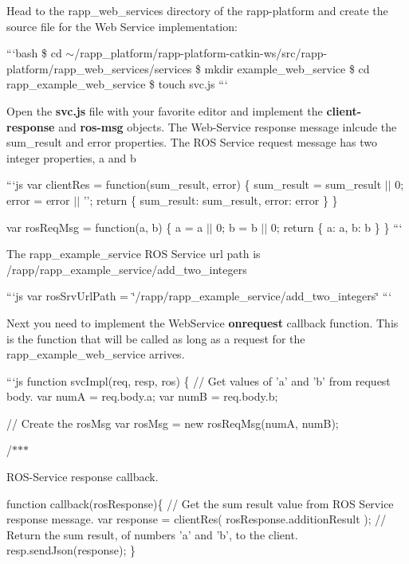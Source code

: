 Head to the {\ttfamily rapp\-\_\-web\-\_\-services} directory of the {\ttfamily rapp-\/platform} and create the source file for the Web Service implementation\-:

```bash \$ cd $\sim$/rapp\-\_\-platform/rapp-\/platform-\/catkin-\/ws/src/rapp-\/platform/rapp\-\_\-web\-\_\-services/services \$ mkdir example\-\_\-web\-\_\-service \$ cd rapp\-\_\-example\-\_\-web\-\_\-service \$ touch svc.\-js ```

Open the {\bfseries svc.\-js} file with your favorite editor and implement the {\bfseries client-\/response} and {\bfseries ros-\/msg} objects. The Web-\/\-Service response message inlcude the {\ttfamily sum\-\_\-result} and {\ttfamily error} properties. The R\-O\-S Service request message has two integer properties, {\ttfamily a} and {\ttfamily b}

```js var client\-Res = function(sum\-\_\-result, error) \{ sum\-\_\-result = sum\-\_\-result $\vert$$\vert$ 0; error = error $\vert$$\vert$ ''; return \{ sum\-\_\-result\-: sum\-\_\-result, error\-: error \} \}

var ros\-Req\-Msg = function(a, b) \{ a = a $\vert$$\vert$ 0; b = b $\vert$$\vert$ 0; return \{ a\-: a, b\-: b \} \} ```

The rapp\-\_\-example\-\_\-service R\-O\-S Service url path is {\ttfamily /rapp/rapp\-\_\-example\-\_\-service/add\-\_\-two\-\_\-integers}

```js var ros\-Srv\-Url\-Path = \char`\"{}/rapp/rapp\-\_\-example\-\_\-service/add\-\_\-two\-\_\-integers\char`\"{} ```

Next you need to implement the Web\-Service {\bfseries onrequest} callback function. This is the function that will be called as long as a request for the rapp\-\_\-example\-\_\-web\-\_\-service arrives.

```js function svc\-Impl(req, resp, ros) \{ // Get values of 'a' and 'b' from request body. var num\-A = req.\-body.\-a; var num\-B = req.\-body.\-b;

// Create the ros\-Msg var ros\-Msg = new ros\-Req\-Msg(num\-A, num\-B);

/$\ast$$\ast$$\ast$
\begin{DoxyItemize}
\item R\-O\-S-\/\-Service response callback.
\end{DoxyItemize}

function callback(ros\-Response)\{ // Get the sum result value from R\-O\-S Service response message. var response = client\-Res( ros\-Response.\-addition\-Result ); // Return the sum result, of numbers 'a' and 'b', to the client. resp.\-send\-Json(response); \}


